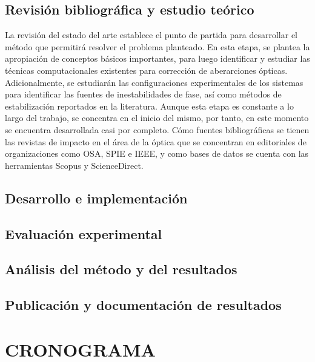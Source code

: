 \documentclass[letter, 12 pt]{article}
\begin{document}
	\subsection{Revisión bibliográfica y estudio teórico}
La revisión del estado del arte establece el punto de partida para desarrollar el método que permitirá resolver el problema planteado. En esta etapa, se plantea la apropiación de conceptos básicos importantes, para luego identificar y estudiar las técnicas computacionales existentes para corrección de aberarciones ópticas. Adicionalmente, se estudiarán las configuraciones experimentales de los sistemas para identificar las fuentes de inestabilidades de fase, así como métodos de estabilización reportados en la literatura. Aunque esta etapa es constante a lo largo del trabajo, se concentra en el inicio del mismo, por tanto, en este momento se encuentra desarrollada casi por completo. Cómo fuentes bibliográficas se tienen las revistas de impacto en el área de la óptica que se concentran en editoriales de organizaciones como OSA, SPIE e IEEE, y como bases de datos se cuenta con las herramientas Scopus y ScienceDirect.\\


	\subsection{Desarrollo e implementación}
	
	\subsection{Evaluación experimental}

	\subsection{Análisis del método y del resultados}
			
	\subsection{Publicación y documentación de resultados}
	

\section{CRONOGRAMA}



\newpage




\end{document}
